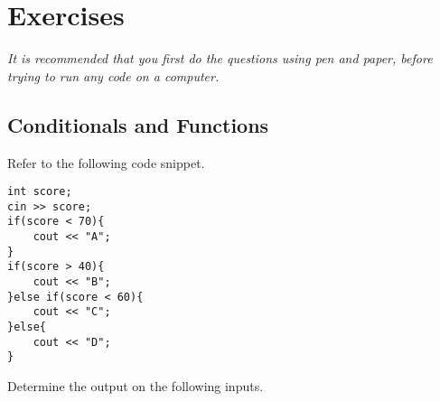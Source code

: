 \section*{Exercises}

\textit{It is recommended that you first do the questions using pen and paper, before trying to run any code on a computer.}

\begin{questions}

\subsection*{Conditionals and Functions}

\miquestion {\footnotesize [A]} Refer to the following code snippet.

\begin{lstlisting}
int score;
cin >> score;
if(score < 70){
    cout << "A";
}
if(score > 40){
    cout << "B";
}else if(score < 60){
    cout << "C";
}else{
    cout << "D";
}
\end{lstlisting}

Determine the output on the following inputs.


\label{q:if1}
\end{questions}
